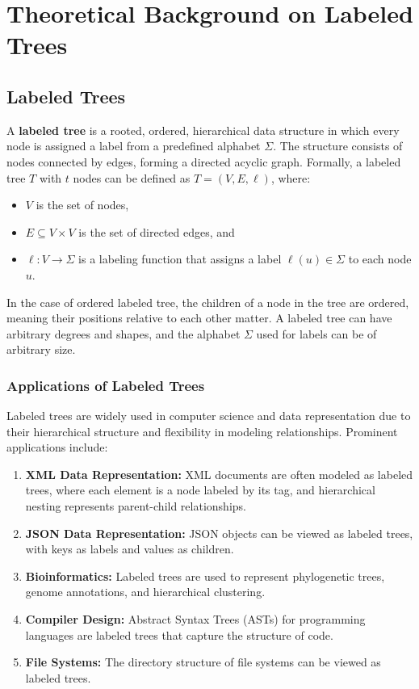 \chapter{Theoretical Background on Labeled Trees}

\section{Labeled Trees}
A \textbf{labeled tree} is a rooted, ordered, hierarchical data structure in which every node is assigned a label from a predefined alphabet $\Sigma$. The structure consists of nodes connected by edges, forming a directed acyclic graph. Formally, a labeled tree $T$ with $t$ nodes can be defined as $T = (V, E, \ell)$, where:
\begin{itemize}
    \item $V$ is the set of nodes,
    \item $E \subseteq V \times V$ is the set of directed edges, and
    \item $\ell: V \to \Sigma$ is a labeling function that assigns a label $\ell(u) \in \Sigma$ to each node $u$.
\end{itemize}

In the case of ordered labeled tree, the children of a node in the tree are ordered, meaning their positions relative to each other matter. A labeled tree can have arbitrary degrees and shapes, and the alphabet $\Sigma$ used for labels can be of arbitrary size.

\subsection{Applications of Labeled Trees}
Labeled trees are widely used in computer science and data representation due to their hierarchical structure and flexibility in modeling relationships. Prominent applications include:
\begin{enumerate}
    \item \textbf{XML Data Representation:} XML documents are often modeled as labeled trees, where each element is a node labeled by its tag, and hierarchical nesting represents parent-child relationships.
    \item \textbf{JSON Data Representation:} JSON objects can be viewed as labeled trees, with keys as labels and values as children.
    \item \textbf{Bioinformatics:} Labeled trees are used to represent phylogenetic trees, genome annotations, and hierarchical clustering.
    \item \textbf{Compiler Design:} Abstract Syntax Trees (ASTs) for programming languages are labeled trees that capture the structure of code.
    \item \textbf{File Systems:} The directory structure of file systems can be viewed as labeled trees.
\end{enumerate}

